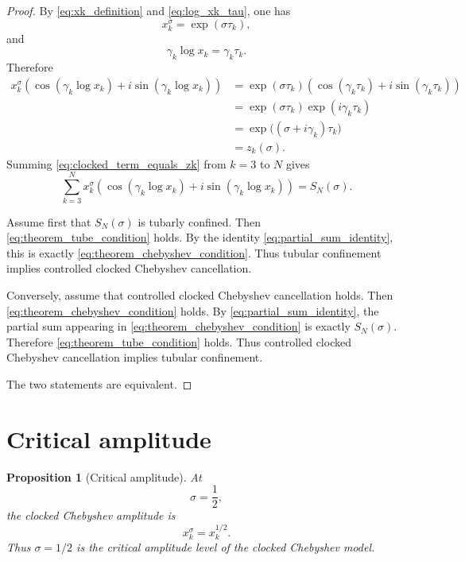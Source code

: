 \documentclass[11pt]{amsart}
\numberwithin{equation}{section}
\theoremstyle{plain}
\newtheorem{proposition}[theorem]{Proposition}
\theoremstyle{definition}
\theoremstyle{remark}
\begin{document}
\begin{proof}
By \eqref{eq:xk_definition} and \eqref{eq:log_xk_tau}, one has
\begin{equation}
x_k^\sigma
=
\exp(\sigma\tau_k),
\label{eq:xk_sigma_expansion}
\end{equation}
and
\begin{equation}
\gamma_k\log x_k
=
\gamma_k\tau_k.
\label{eq:gamma_log_xk_identity}
\end{equation}
Therefore
\begin{align}
x_k^\sigma
\left(
\cos(\gamma_k\log x_k)
+
i\sin(\gamma_k\log x_k)
\right)
&=
\exp(\sigma\tau_k)
\left(
\cos(\gamma_k\tau_k)
+
i\sin(\gamma_k\tau_k)
\right)
\label{eq:clocked_term_expanded}
\\
&=
\exp(\sigma\tau_k)\exp(i\gamma_k\tau_k)
\label{eq:clocked_term_euler}
\\
&=
\exp\big((\sigma+i\gamma_k)\tau_k\big)
\label{eq:clocked_term_combined}
\\
&=
z_k(\sigma).
\label{eq:clocked_term_equals_zk}
\end{align}
Summing \eqref{eq:clocked_term_equals_zk} from $k=3$ to $N$ gives
\begin{equation}
\sum_{k=3}^{N}
x_k^\sigma
\left(
\cos(\gamma_k\log x_k)
+
i\sin(\gamma_k\log x_k)
\right)
=
S_N(\sigma).
\label{eq:partial_sum_identity}
\end{equation}

Assume first that $S_N(\sigma)$ is tubarly confined. Then
\eqref{eq:theorem_tube_condition} holds. By the identity
\eqref{eq:partial_sum_identity}, this is exactly
\eqref{eq:theorem_chebyshev_condition}. Thus tubular confinement implies
controlled clocked Chebyshev cancellation.

Conversely, assume that controlled clocked Chebyshev cancellation holds.
Then \eqref{eq:theorem_chebyshev_condition} holds. By
\eqref{eq:partial_sum_identity}, the partial sum appearing in
\eqref{eq:theorem_chebyshev_condition} is exactly $S_N(\sigma)$.
Therefore \eqref{eq:theorem_tube_condition} holds. Thus controlled
clocked Chebyshev cancellation implies tubular confinement.

The two statements are equivalent.
\end{proof}

\section{Critical amplitude}
\label{sec:critical_amplitude}

\begin{proposition}[Critical amplitude]
\label{prop:critical_amplitude}
At
\begin{equation}
\sigma=\frac12,
\label{eq:sigma_half}
\end{equation}
the clocked Chebyshev amplitude is
\begin{equation}
x_k^\sigma=x_k^{1/2}.
\label{eq:critical_amplitude_identity}
\end{equation}
Thus $\sigma=1/2$ is the critical amplitude level of the clocked
Chebyshev model.
\end{proposition}
\end{document}
